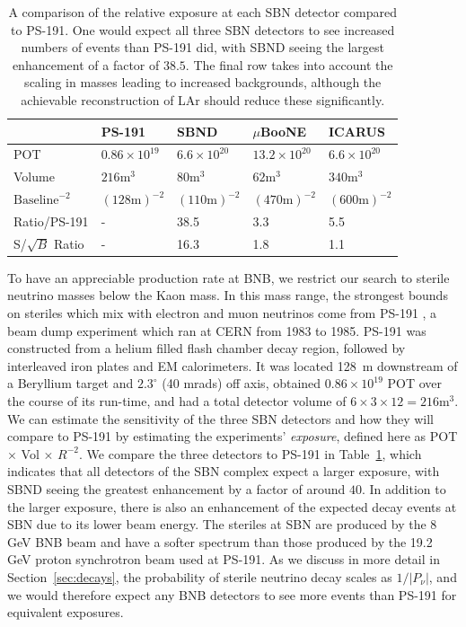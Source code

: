 \documentclass[11pt, a4paper]{article}
\newcommand{\refsec}[1]{Section~\ref{#1}}
\newcommand{\reftab}[1]{Table~\ref{#1}}
\begin{document}
\begin{table}[t!]
\centering
\begin{tabular}{| l || l | l | l | l |}
	\hline
	& PS-191 & SBND & $\mu$BooNE & ICARUS \\ \hline \hline
	POT	& $0.86 \times 10^{19}$	& $6.6 \times 10^{20}$	&	$13.2 \times 10^{20}$     &  $6.6 \times 10^{20}$ \\ \hline
	Volume	& $216\text{m}^3$	&	$80\text{m}^3$	&	$62\text{m}^3$	     &   $340\text{m}^3$	\\ \hline
	$\text{Baseline}^{-2}$	& $(128 	\text{m} )^{-2}$	&$(110 \text{m} )^{-2}$	&	$(470 \text{m} )^{-2}$			     & $(600 \text{m} )^{-2}$	  \\ \hline
Ratio/PS-191 & - 	& 38.5 	& 3.3	& 5.5\\ \hline
	S/$\sqrt{B}$ Ratio & - 	& 16.3 	& 1.8	& 1.1\\ \hline
\end{tabular}

\caption{\label{tab:exposure} A comparison of the relative exposure at each SBN detector
compared to PS-191. One would expect all  three SBN detectors to see increased
numbers of events than PS-191 did, with SBND seeing the largest enhancement of a
factor of $38.5$. The final row takes into account the scaling in masses
leading to increased backgrounds, although the achievable reconstruction of LAr
should reduce these significantly.}

\end{table}

To have an appreciable production rate at BNB, we restrict our search to
sterile neutrino masses below the Kaon mass. In this mass range, the strongest
bounds on steriles which mix with electron and muon neutrinos come from PS-191
\cite{Bernardi:1985ny,Bernardi:1987ek}, a beam dump experiment which ran at
CERN from 1983 to 1985. 
%
PS-191 was constructed from a helium filled flash chamber decay region,
followed by interleaved iron plates and EM calorimeters. It was located 128~m
downstream of a Beryllium target and $2.3^\circ$ (40 mrads) off axis, obtained
$0.86 \times 10^{19}$ POT over the course of its run-time, and had a total
detector volume of $6\times3\times12 = 216 \text{m}^3$. We can estimate the
sensitivity of the three SBN detectors and how they will compare to PS-191 by
estimating the experiments' \emph{exposure}, defined here as POT $\times$ Vol
$\times$ $R^{-2}$. We compare the three detectors to PS-191 in
\reftab{tab:exposure}, which indicates that all detectors of the SBN complex
expect a larger exposure, with SBND seeing the greatest enhancement by a factor
of around $40$. 
%
In addition to the larger exposure, there is also an enhancement of the
expected decay events at SBN due to its lower beam energy. The steriles at SBN
are produced by the 8 GeV BNB beam and have a softer spectrum than those
produced by the 19.2 GeV proton synchrotron beam used at PS-191. As we discuss
in more detail in \refsec{sec:decays}, the probability of sterile neutrino
decay scales as $1/|P_\nu|$, and we would therefore expect any BNB detectors to
see more events than PS-191 for equivalent exposures.
\end{document}
